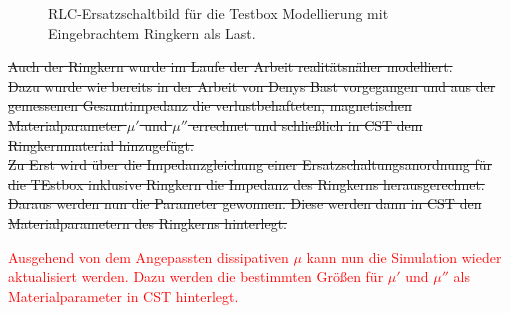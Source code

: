                 \begin{figure}[htb]
                    \centering
                    \caption{RLC-Ersatzschaltbild f\"ur die Testbox Modellierung mit Eingebrachtem Ringkern als Last.}
                    \label{fig:BoxRKCircuit}
                \end{figure}
                
                    
	    \sout{%
	    Auch der Ringkern wurde im Laufe der Arbeit realitätsnäher modelliert.\\
            Dazu wurde wie bereits in der Arbeit von Denys Bast vorgegangen und aus der gemessenen Gesamtimpedanz die verlustbehafteten, magnetischen Materialparameter $\mu'$ und $\mu''$ errechnet und schließlich in CST dem Ringkernmaterial hinzugefügt.\\
            Zu Erst wird über die Impedanzgleichung einer Ersatzschaltungsanordnung für die TEstbox inklusive Ringkern die Impedanz des Ringkerns herausgerechnet. Daraus werden nun die Parameter gewonnen. Diese werden dann in CST den Materialparametern des Ringkerns hinterlegt.
            }
            
            \textcolor{red}{%
            Ausgehend von dem Angepassten dissipativen $\mu$ kann nun die Simulation wieder aktualisiert werden. Dazu werden die bestimmten Gr\"o\ss{}en f\"ur $\mu'$ und $\mu''$ als Materialparameter in CST hinterlegt.
            }
           
